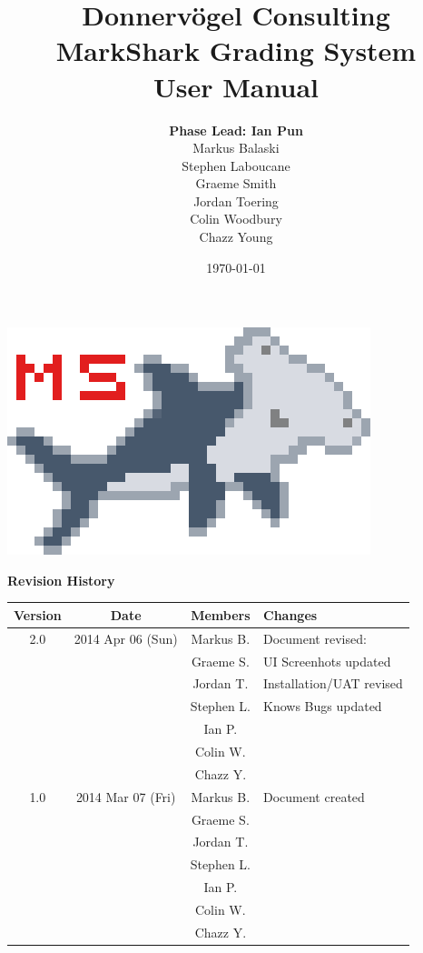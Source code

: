\documentclass{article}
\begin{document}
\title{Donnervögel Consulting \\ MarkShark Grading System \\ User Manual}
\author{\textbf{Phase Lead: Ian Pun} \\ Markus Balaski \\ Stephen Laboucane \\
  Graeme Smith \\ Jordan Toering \\  Colin Woodbury \\ Chazz Young}
\date{\today}
\maketitle
\centerline{\includegraphics{../images/logo/markshark-10x}}
\clearpage

\textbf{Revision History}
\begin{center}
  \begin{tabular}{| c | c | c | l |}
    \hline
    Version & Date & Members & Changes\\
    \hline
    2.0 & 2014 Apr 06 (Sun) & Markus B. & Document revised: \\
    & & Graeme S. & UI Screenhots updated \\
    & & Jordan T. & Installation/UAT revised \\
    & & Stephen L. & Knows Bugs updated \\
    & & Ian P. & \\
    & & Colin W. & \\
    & & Chazz Y. & \\
	\hline    
    1.0 & 2014 Mar 07 (Fri) & Markus B. & Document created\\
    & & Graeme S. & \\
    & & Jordan T. & \\
    & & Stephen L. & \\
    & & Ian P. & \\
    & & Colin W. & \\
    & & Chazz Y. & \\
    \hline
  \end{tabular}
\end{center}
\clearpage
\end{document}
